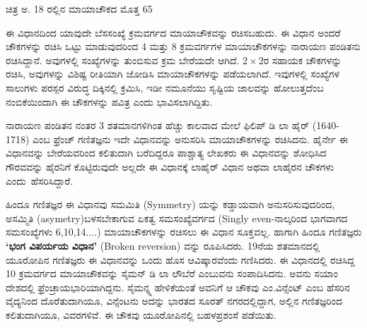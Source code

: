ಚಿತ್ರ ಅ. 18 ರಲ್ಲಿನ ಮಾಯಾಚೌಕದ ಮೊತ್ತ 65

ಈ ವಿಧಾನದಿಂದ ಯಾವುದೇ ಬೆಸಸಂಖ್ಯೆ ಕ್ರಮವರ್ಗದ ಮಾಯಾಚೌಕವನ್ನು ರಚಿಸ\-ಬಹುದು. ಈ ವಿಧಾನ ಅಂದರೆ ಚೌಕಗಳನ್ನು ರಚಿಸಿ ಒಟ್ಟು ಮಾಡುವುದರಿಂದ 4 ಮತ್ತು 8 ಕ್ರಮ\-ವರ್ಗಗಳ ಮಾಯಾಚೌಕಗಳನ್ನು ನಾರಾಯಣ ಪಂಡಿತನು ರಚಿಸಿದ್ದಾನೆ. ಅವುಗಳಲ್ಲಿ ಸಂಖ್ಯೆ\-ಗಳನ್ನು ತುಂಬಿಸುವ ಕ್ರಮ ಬೇರೆಯದೇ ಆಗಿದೆ. $2 \times 2$ರ ಸಹಾಯಕ ಚೌಕಗಳನ್ನು ರಚಿಸಿ, ಅವುಗಳನ್ನು ವಿಶಿಷ್ಟ ರೀತಿಯಾಗಿ ಜೋಡಿಸಿ ಮಾಯಾಚೌಕಗಳನ್ನು ಪಡೆಯಲಾಗಿದೆ. ಇವುಗಳಲ್ಲಿ ಸಂಖ್ಯೆಗಳ ಸಾಲುಗಳು ಪರಸ್ಪರ ವಿರುದ್ಧ ದಿಕ್ಕಿನಲ್ಲಿ ಕ್ರಮಿಸಿ, ಇಡೀ ನಮೂನೆಯು ಸೃಷ್ಟಿಯ ಜಾಲವನ್ನು ಹೋಲುತ್ತದೆಂಬ ನಂಬಿಕೆಯಿಂದಾಗಿ ಈ ಚೌಕಗಳನ್ನು ಪವಿತ್ರ ಎಂದು ಭಾವಿಸ\-ಲಾಗಿದ್ದಿತು.

ನಾರಾಯಣ ಪಂಡಿತನ ನಂತರ 3 ಶತಮಾನಗಳಿಗಿಂತ ಹೆಚ್ಚು ಕಾಲವಾದ ಮೇಲೆ ಫಿಲಿಪ್ ಡಿ ಲಾ ಹೈರ್ (1640-1718) ಎಂಬ ಫ್ರೆಂಚ್ ಗಣಿತಜ್ಞನು ಇದೇ ವಿಧಾನವನ್ನು ಅನುಸರಿಸಿ ಮಾಯಾಚೌಕಗಳನ್ನು ರಚಿಸಿದನು. ಹೈರ್ನೇ ಈ ವಿಧಾನವನ್ನು ಬೇರೆಯವರಿಂದ ಕಲಿತುದಾಗಿ ಬರೆದಿದ್ದರೂ ಪಾಶ್ಚಾತ್ಯ ಲೇಖಕರು ಈ ವಿಧಾನವನ್ನು ಶೋಧಿಸಿದ ಗೌರವವನ್ನು ಹೈರ\-ನಿಗೆ ಕೊಟ್ಟಿರುವುದೇ ಅಲ್ಲದೇ ಈ ವಿಧಾನಕ್ಕೆ ಲಾಹೈರ್ ವಿಧಾನ ಅಥವಾ ಲಾಹೈರನ ಚೌಕಗಳು \hbox{ಎಂದು ಹೆಸರಿಸಿದ್ದಾರೆ.}

ಹಿಂದೂ ಗಣಿತಜ್ಞರ ಈ ವಿಧಾನವು ಸಮಮಿತಿ (Symmetry) ಯನ್ನು ಕಡ್ಡಾಯವಾಗಿ ಅನುಸರಿಸುವುದರಿಂದ, ಅಸಮ್ಮಿತಿ (asymetry)ಬಳಸಬೇಕಾಗುವ ಏಕತ್ವ ಸಮಸಂಖ್ಯೆ\-ವರ್ಗದ (Singly even-ನಾಲ್ಕರಿಂದ ಭಾಗವಾಗದ ಸಮಸಂಖ್ಯೆಗಳು 6,10,14....) ಮಾಯಾ\-ಚೌಕಗಳನ್ನು ರಚಿಸಲು ಈ ವಿಧಾನ ಸೂಕ್ತವಲ್ಲ. ಹಾಗಾಗಿ ಹಿಂದೂ ಗಣಿತಜ್ಞರು \textbf{‘ಭಂಗ ವಿಪರ್ಯಯ ವಿಧಾನ’} (Broken reversion) ವನ್ನು ರೂಪಿಸಿದರು. 19ನೆಯ ಶತಮಾನದಲ್ಲಿ ಯೂರೋಪಿನ ಗಣಿತಜ್ಞರು ಈ ವಿಧಾನವನ್ನು ಒಂದು ಹೊಸ ಆವಿಷ್ಕಾರವೆಂದು ಗಣಿಸಿದರು. ಈ ವಿಧಾನದಲ್ಲಿ  ರಚಿಸಿದ್ದ 10 ಕ್ರಮವರ್ಗದ ಮಾಯಾಚೌಕವನ್ನು ಸೈಮನ್ ಡಿ ಲಾ ಲೌಬೆರೆ \break ಎಂಬುವನು ಸಂಪಾದಿಸಿದನು. ಅವನು ಸಯಾಂ ದೇಶದಲ್ಲಿ ಫ್ರೆಂಚ್ರಾಯಭಾರಿಯಾಗಿದ್ದನು. ಸೈಮನ್ನ್ನ ಹೇಳಿಕೆಯಂತೆ ಅವನಿಗೆ ಆ ಚೌಕವು ಎಂ.ವಿನ್ಸೆಂಟ್ ಎಂಬ ಹೆಸರಿನ ವೈದ್ಯನಿಂದ ದೊರೆತು\-ದಾಗಿಯೂ, ವಿನ್ಸೆಂಟನು ಅದನ್ನು ಭಾರತದ ಸೂರತ್ ನಗರದಲ್ಲಿದ್ದಾಗ, ಅಲ್ಲಿನ \hbox{ಗಣಿತಜ್ಞರಿಂದ} ಕಲಿತುದಾಗಿಯೂ, ವಿವರಗಳಿವೆ. ಈ ಚೌಕವು ಯೂರೋಪಿನಲ್ಲಿ ಬಹಳ\break  ಪ್ರಶಂಸೆ ಪಡೆಯಿತು.

